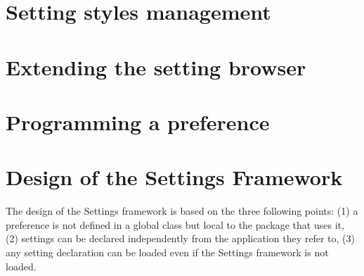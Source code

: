 \documentclass[a4paper,10pt,twoside]{book}
\begin{document}
%
%
%					
%


\section{Setting styles management}
\label{sec:SettingStylesManagement}

\section{Extending the setting browser}
\label{sec:ExtendingTheSettingsBrowser}

\section{Programming a preference}
\label{sec:ProgrammingAPreference}

\section{Design of the Settings Framework}
The design of the Settings framework is based on the three following points: (1) a preference is not defined in a global class but local to the package that uses it, (2) settings can be declared independently from the application they refer to, (3) any setting declaration can be loaded even if the Settings framework is not loaded. 
\end{document}
